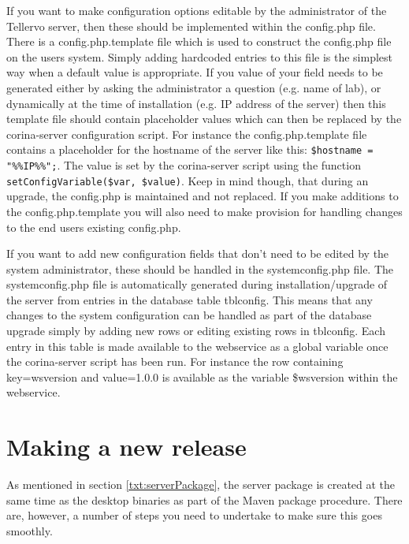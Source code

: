 If you want to make configuration options editable by the administrator of the Tellervo server, then these should be implemented within the config.php file.  There is a config.php.template file which is used to construct the config.php file on the users system.  Simply adding hardcoded entries to this file is the simplest way when a default value is appropriate.  If you value of your field needs to be generated either by asking the administrator a question (e.g. name of lab), or dynamically at the time of installation (e.g. IP address of the server) then this template file should contain placeholder values which can then be replaced by the corina-server configuration script.  For instance the config.php.template file contains a placeholder for the hostname of the server like this: \verb|$hostname = "%%IP%%";|.  The value is set by the corina-server script using the function \verb|setConfigVariable($var, $value)|.  Keep in mind though, that during an upgrade, the config.php is maintained and not replaced.  If you make additions to the config.php.template you will also need to make provision for handling changes to the end users existing config.php.

If you want to add new configuration fields that don't need to be edited by the system administrator, these should be handled in the systemconfig.php file.  The systemconfig.php file is automatically generated during installation/upgrade of the server from entries in the database table tblconfig.  This means that any changes to the system configuration can be handled as part of the database upgrade simply by adding new rows or editing existing rows in tblconfig.  Each entry in this table is made available to the webservice as a global variable once the corina-server script has been run.  For instance the row containing key=wsversion and value=1.0.0 is available as the variable \$wsversion within the webservice. 



\section{Making a new release}

As mentioned in section \ref{txt:serverPackage}, the server package is created at the same time as the desktop binaries as part of the Maven package procedure.  There are, however, a number of steps you need to undertake to make sure this goes smoothly.

